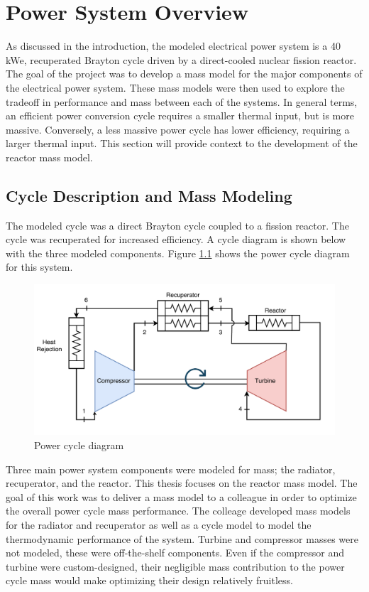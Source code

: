 \chapter{Power System Overview}
As discussed in the introduction, the modeled electrical power system is a 40
kWe, recuperated Brayton cycle driven by a direct-cooled nuclear fission reactor. The goal
of the project was to develop a mass model for the major components of the
electrical power system. These mass models were then used to explore the
tradeoff in performance and mass between each of the systems. In general terms,
an efficient power conversion cycle requires a smaller thermal input, but is
more massive. Conversely, a less massive power cycle has lower efficiency,
requiring a larger thermal input. This section will provide context to the
development of the reactor mass model.

\section{Cycle Description and Mass Modeling}
The modeled cycle was a direct Brayton cycle coupled to a fission reactor. The
cycle was recuperated for increased efficiency. A cycle diagram is shown below
with the three modeled components. Figure \ref{fig:power_cycle} shows the power
cycle diagram for this system.

\begin{figure}[h]
    \centering
    \includegraphics[width=5in]{../images/power_cycle.png}
\caption{Power cycle diagram}
\label{fig:power_cycle}
\end{figure}

Three main power system components were modeled for
mass; the radiator, recuperator, and the reactor. This thesis focuses on the
reactor mass model. The goal of this work was to deliver a mass
model to a colleague in order to optimize the overall power cycle mass
performance. The colleage developed mass models for the radiator and recuperator
as well as a cycle model to model the thermodynamic performance of the system.
Turbine and compressor masses were not modeled, these were off-the-shelf
components. Even if the compressor and turbine were custom-designed, their
negligible mass contribution to the power cycle mass would make optimizing their
design relatively fruitless.

